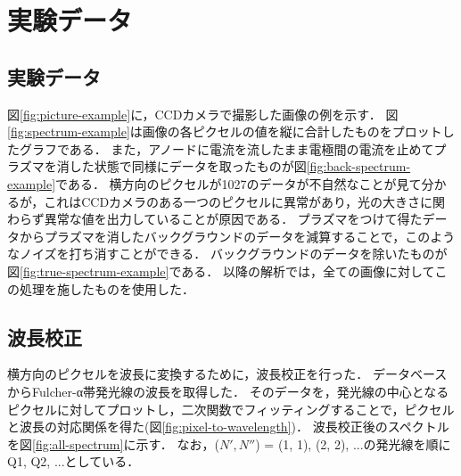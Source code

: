 \chapter{実験データ}

\section{実験データ}
図\ref{fig:picture-example}に，CCDカメラで撮影した画像の例を示す．
図\ref{fig:spectrum-example}は画像の各ピクセルの値を縦に合計したものをプロットしたグラフである．
また，アノードに電流を流したまま電極間の電流を止めてプラズマを消した状態で同様にデータを取ったものが図\ref{fig:back-spectrum-example}である．
横方向のピクセルが1027のデータが不自然なことが見て分かるが，これはCCDカメラのある一つのピクセルに異常があり，光の大きさに関わらず異常な値を出力していることが原因である．
プラズマをつけて得たデータからプラズマを消したバックグラウンドのデータを減算することで，このようなノイズを打ち消すことができる．
バックグラウンドのデータを除いたものが図\ref{fig:true-spectrum-example}である．
以降の解析では，全ての画像に対してこの処理を施したものを使用した．

\section{波長校正}
横方向のピクセルを波長に変換するために，波長校正を行った．
データベース\cite{H2-spectrum-data}からFulcher-α帯発光線の波長を取得した．
そのデータを，発光線の中心となるピクセルに対してプロットし，二次関数でフィッティングすることで，ピクセルと波長の対応関係を得た(図\ref{fig:pixel-to-wavelength})．
波長校正後のスペクトルを図\ref{fig:all-spectrum}に示す．
なお，($N', N''$) = (1, 1), (2, 2), ...の発光線を順にQ1, Q2, ...としている．